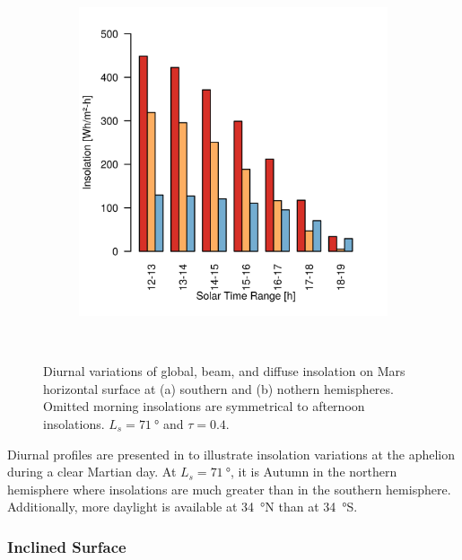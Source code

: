 \begin{figure}[h]
\begin{subfigure}[t]{\subfigureWidth}
            \includegraphics[height=\graphicsHeight]{sections/mars-solar-energy/solar-radiation/plots/ih-ibh-and-idh-variation-2-for-ls-71-phi-34-tau-04-and-albedo-027.png}
            \label{fig:plot:sub:insolation-phi-p34}
    \end{subfigure}\\[0.8ex]
    \caption[Diurnal insolation variations]
    {Diurnal variations of global, beam, and diffuse insolation on Mars horizontal surface at (a) southern and (b) nothern hemispheres. Omitted morning insolations are symmetrical to afternoon insolations. $L_{s} = \SI{71}{\degree}$ and $\tau = 0.4$.}
    \label{fig:plot:insolation-phi}
\vspace{-2ex}
\end{figure}

\vspace{0.5cm}

Diurnal profiles are presented in  to illustrate insolation variations at the aphelion during a clear Martian day. At $L_{s} = \SI{71}{\degree}$, it is Autumn in the northern hemisphere where insolations are much greater than in the southern hemisphere. Additionally, more daylight is available at \SI{34}{\degree}N than at \SI{34}{\degree}S.

\subsubsection{Inclined Surface}
\label{sec:MartianEnvironment:SolarRadiation:InclinedSurface}


